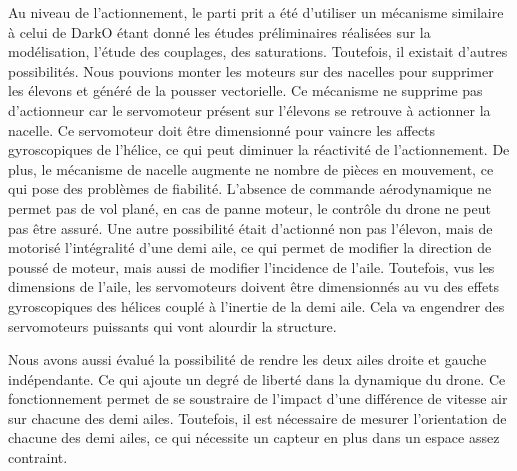 {Au niveau de l'actionnement, le parti prit a été d'utiliser un mécanisme similaire à celui de DarkO étant donné les études préliminaires réalisées sur la modélisation, l'étude des couplages, des saturations. Toutefois, il existait d'autres possibilités.
Nous pouvions monter les moteurs sur des nacelles pour supprimer les élevons et généré de la pousser vectorielle. Ce mécanisme ne supprime pas d'actionneur car le servomoteur présent sur l'élevons se retrouve à actionner la nacelle. Ce servomoteur doit être dimensionné pour vaincre les affects gyroscopiques de l'hélice, ce qui peut diminuer la réactivité de l'actionnement. De plus, le mécanisme de nacelle augmente ne nombre de pièces en mouvement, ce qui pose des problèmes de fiabilité. L'absence de commande aérodynamique ne permet pas de vol plané, en cas de panne moteur, le contrôle du drone ne peut pas être assuré.
Une autre possibilité était d'actionné non pas l'élevon, mais de motorisé l'intégralité d'une demi aile, ce qui permet de modifier la direction de poussé de moteur, mais aussi de modifier l'incidence de l'aile. Toutefois, vus les dimensions de l'aile, les servomoteurs doivent être dimensionnés au vu des effets gyroscopiques des hélices couplé à l'inertie de la demi aile. Cela va engendrer des servomoteurs puissants qui vont alourdir la structure.

 Nous avons aussi évalué la possibilité de rendre les deux ailes droite et gauche indépendante. Ce qui ajoute un degré de liberté dans la dynamique du drone. Ce fonctionnement permet de se soustraire de l'impact d'une différence de vitesse air sur chacune des demi ailes. Toutefois, il est nécessaire de mesurer l'orientation de chacune des demi ailes, ce qui nécessite un capteur en plus dans un espace assez contraint.

}
